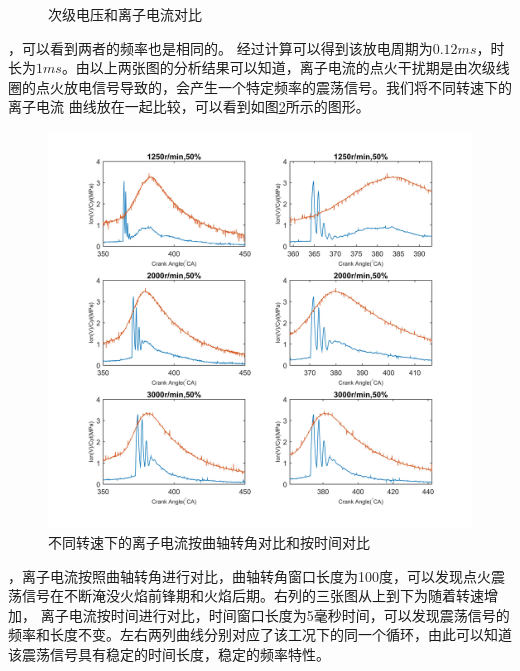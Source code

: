 \begin{figure}[H]
\begin{minipage}{0.5\linewidth}
\end{minipage}
	\caption{次级电压和离子电流对比}
	\label{fig:itf_rs}
\end{figure}
，可以看到两者的频率也是相同的。
经过计算可以得到该放电周期为$0.12ms$，时长为$1ms$。由以上两张图的分析结果可以知道，离子电流的点火干扰期是由次级线圈的点火放电信号导致的，会产生一个特定频率的震荡信号。我们将不同转速下的离子电流
曲线放在一起比较，可以看到如图\ref{fig:dif_rpm_ion}所示的图形。
\begin{figure}[!ht]
	\centering
	\includegraphics[width=\textwidth]{thesis_figure/ion_chapter/dif_rpm_ion}
	\caption{不同转速下的离子电流按曲轴转角对比和按时间对比}
	\label{fig:dif_rpm_ion}
\end{figure}
，离子电流按照曲轴转角进行对比，曲轴转角窗口长度为100度，可以发现点火震荡信号在不断淹没火焰前锋期和火焰后期。右列的三张图从上到下为随着转速增加，
离子电流按时间进行对比，时间窗口长度为5毫秒时间，可以发现震荡信号的频率和长度不变。左右两列曲线分别对应了该工况下的同一个循环，由此可以知道该震荡信号具有稳定的时间长度，稳定的频率特性。
